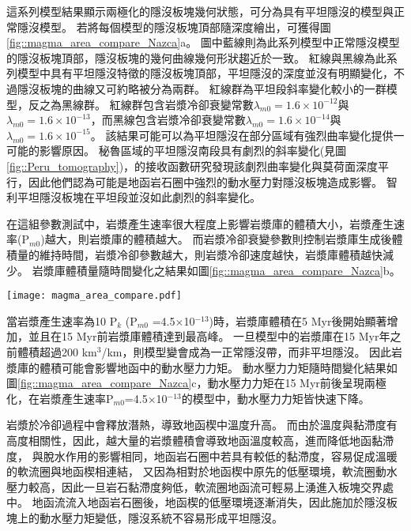 這系列模型結果顯示兩極化的隱沒板塊幾何狀態，可分為具有平坦隱沒的模型與正常隱沒模型。
若將每個模型的隱沒板塊頂部隨深度繪出，可獲得圖\ref{fig::magma_area_compare_Nazca}a。
圖中藍線則為此系列模型中正常隱沒模型的隱沒板塊頂部，隱沒板塊的幾何曲線幾何形狀趨近於一致。
紅線與黑線為此系列模型中具有平坦隱沒特徵的隱沒板塊頂部，平坦隱沒的深度並沒有明顯變化，不過隱沒板塊的曲線又可約略被分為兩群。
紅線群為平坦段斜率變化較小的一群模型，反之為黑線群。
紅線群包含岩漿冷卻衰變常數$\lambda_{m0}=1.6\times 10^{-12}$與$\lambda_{m0}=1.6\times 10^{-13}$，而黑線包含岩漿冷卻衰變常數$\lambda_{m0}=1.6\times 10^{-14}$與$\lambda_{m0}=1.6\times 10^{-15}$。
該結果可能可以為平坦隱沒在部分區域有強烈曲率變化提供一可能的影響原因。
秘魯區域的平坦隱沒南段具有劇烈的斜率變化(見圖\ref{fig::Peru_tomography})，\citet{Ma2015}的接收函數研究發現該劇烈曲率變化與莫荷面深度平行，因此他們認為可能是地函岩石圈中強烈的動水壓力對隱沒板塊造成影響。
智利平坦隱沒板塊在平坦段並沒如此劇烈的斜率變化。

在這組參數測試中，岩漿產生速率很大程度上影響岩漿庫的體積大小，岩漿產生速率(P$_{m0}$)越大，則岩漿庫的體積越大。
而岩漿冷卻衰變參數則控制岩漿庫生成後體積量的維持時間，岩漿冷卻參數越大，則岩漿冷卻速度越快，岩漿庫體積越快減少。
岩漿庫體積量隨時間變化之結果如圖\ref{fig::magma_area_compare_Nazca}b。

\begin{figure*}[ht!]
    \centering
    \texttt{[image: magma\_area\_compare.pdf]}
    \caption[智利模型岩漿參數測試結果，詳細岩漿參數見表\ref{模型參數列表}與圖\ref{fig::magma parameter}]{智利模型岩漿參數測試結果，詳細岩漿參數見表\ref{模型參數列表}與圖\ref{fig::magma parameter}。圖中不同線條(模型間)的顏色分類與圖\ref{fig::magma parameter}相同，共將模型分成三群。(a)隱沒板塊幾何形狀。(b)所有模型岩漿庫體積隨時間變化。(c)所有模型動水壓力力矩隨時間變化。}
    \label{fig::magma_area_compare_Nazca}
\end{figure*}

當岩漿產生速率為10 P$_k$ (P$_{m0}$ =4.5$\times$10$^{-13}$)時，岩漿庫體積在5 Myr後開始顯著增加，並且在15 Myr前岩漿庫體積達到最高峰。
一旦模型中的岩漿庫在15 Myr年之前體積超過200 km$^3$/km，則模型變會成為一正常隱沒帶，而非平坦隱沒。
因此岩漿庫的體積可能會影響地函中的動水壓力力矩。
動水壓力力矩隨時間變化結果如圖\ref{fig::magma_area_compare_Nazca}c，動水壓力力矩在15 Myr前後呈現兩極化，在岩漿產生速率P$_{m0}$=4.5$\times$10$^{-13}$的模型中，動水壓力力矩皆快速下降。

岩漿於冷卻過程中會釋放潛熱，導致地函楔中溫度升高。
而由於溫度與黏滯度有高度相關性，因此，越大量的岩漿體積會導致地函溫度較高，進而降低地函黏滯度，
與脫水作用的影響相同，地函岩石圈中若具有較低的黏滯度，容易促成溫暖的軟流圈與地函楔相連結，
又因為相對於地函楔中原先的低壓環境，軟流圈動水壓力較高，因此一旦岩石黏滯度夠低，軟流圈地函流可輕易上湧進入板塊交界處中。
地函流流入地函岩石圈後，地函楔的低壓環境逐漸消失，因此施加於隱沒板塊上的動水壓力矩變低，隱沒系統不容易形成平坦隱沒。

